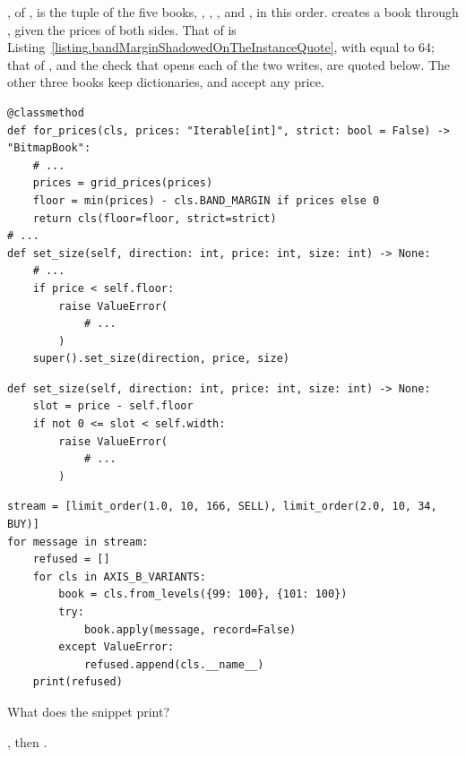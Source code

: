 \begin{question}
\label{question.fiveBooksOnPricesOutsideTheBand}
, of , is the tuple of the five books,
, , , 
and , in this order.
 creates a book through , given the prices of both sides.
That of  is Listing~\ref{listing.bandMarginShadowedOnTheInstanceQuote},
with  equal to 64;
that of , and the check that opens each of the two writes, are quoted below.
The other three books keep dictionaries, and accept any price.
\begin{lstlisting}[caption={\protect\codehl{unito26.lob.orderbook.BitmapBook}: the floor, and the check that opens a write.}, label=listing.fiveBooksOnPricesOutsideTheBandBitmap]
@classmethod
def for_prices(cls, prices: "Iterable[int]", strict: bool = False) -> "BitmapBook":
    # ...
    prices = grid_prices(prices)
    floor = min(prices) - cls.BAND_MARGIN if prices else 0
    return cls(floor=floor, strict=strict)
# ...
def set_size(self, direction: int, price: int, size: int) -> None:
    # ...
    if price < self.floor:
        raise ValueError(
            # ...
        )
    super().set_size(direction, price, size)
\end{lstlisting}
\begin{lstlisting}[caption={\protect\codehl{unito26.lob.orderbook.TickArrayBook.set\_size}: the check that opens it.}, label=listing.fiveBooksOnPricesOutsideTheBandTickArray]
def set_size(self, direction: int, price: int, size: int) -> None:
    slot = price - self.floor
    if not 0 <= slot < self.width:
        raise ValueError(
            # ...
        )
\end{lstlisting}
\begin{lstlisting}[caption={Two limit orders, each given to a fresh book of each class}, label=listing.fiveBooksOnPricesOutsideTheBandRun]
stream = [limit_order(1.0, 10, 166, SELL), limit_order(2.0, 10, 34, BUY)]
for message in stream:
    refused = []
    for cls in AXIS_B_VARIANTS:
        book = cls.from_levels({99: 100}, {101: 100})
        try:
            book.apply(message, record=False)
        except ValueError:
            refused.append(cls.__name__)
    print(refused)
\end{lstlisting}
What does the snippet print?
\begin{choices}
 \choice \codehl{[]}, then \codehl{[]}.

\end{choices}
\end{question}
